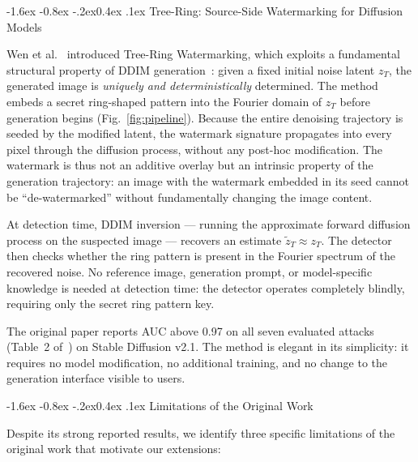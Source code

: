\documentclass[10pt,twocolumn]{article}
\makeatletter
\renewcommand\subsection{\@startsection{subsection}{2}{\z@}%
  {-1.6ex \@plus -0.8ex \@minus -.2ex}{0.4ex \@plus .1ex}%
  {\normalfont\normalsize\itshape}}
\makeatother
\begin{document}
\subsection{Tree-Ring: Source-Side Watermarking for Diffusion Models}

Wen et al.~\cite{wen2023treering} introduced Tree-Ring Watermarking,
which exploits a fundamental structural property of DDIM
generation~\cite{song2020ddim}: given a fixed initial noise latent
$z_T$, the generated image is \emph{uniquely and deterministically}
determined.
The method embeds a secret ring-shaped pattern into the Fourier domain
of $z_T$ before generation begins (Fig.~\ref{fig:pipeline}).
Because the entire denoising trajectory is seeded by the modified
latent, the watermark signature propagates into every pixel through
the diffusion process, without any post-hoc modification.
The watermark is thus not an additive overlay but an intrinsic property
of the generation trajectory: an image with the watermark embedded in
its seed cannot be ``de-watermarked'' without fundamentally changing
the image content.

At detection time, DDIM inversion --- running the approximate forward
diffusion process on the suspected image --- recovers an estimate
$\tilde{z}_T \approx z_T$.
The detector then checks whether the ring pattern is present in the
Fourier spectrum of the recovered noise.
No reference image, generation prompt, or model-specific knowledge is
needed at detection time: the detector operates completely blindly,
requiring only the secret ring pattern key.

The original paper reports AUC above 0.97 on all seven evaluated
attacks (Table~2 of~\cite{wen2023treering}) on Stable Diffusion v2.1.
The method is elegant in its simplicity: it requires no model
modification, no additional training, and no change to the generation
interface visible to users.

\subsection{Limitations of the Original Work}

Despite its strong reported results, we identify three specific
limitations of the original work that motivate our extensions:
\end{document}
